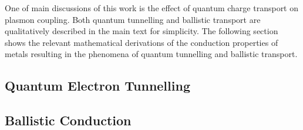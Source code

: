 \documentclass[a4paper]{article}
\begin{document}
One of main discussions of this work is the effect of quantum charge transport on plasmon coupling. Both quantum tunnelling and ballistic transport are qualitatively described in the main text for simplicity. The following section shows the relevant mathematical derivations of the conduction properties of metals resulting in the phenomena of quantum tunnelling and ballistic transport.

\subsection{Quantum Electron Tunnelling}

\subsection{Ballistic Conduction}
\end{document}
